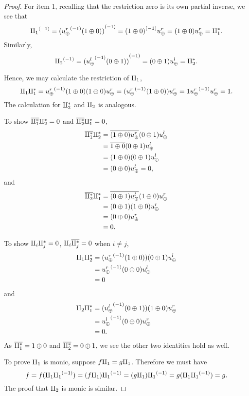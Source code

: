 \begin{proof}
  For item 1, recalling that the restriction zero is its own partial inverse,
  we see that
  \[
    {\amalg_{1}}^{(-1)} = {({u_{\oplus}^r}^{(-1)}(1\oplus0))}^{(-1)}  = {(1\oplus0)}^{(-1)}u_{\oplus}^r = (1\oplus0)u_{\oplus}^r = \amalg_{1}^{*}.
  \]
  Similarly,
  \[
    {\amalg_{2}}^{(-1)} = {({u_{\oplus}^l}^{(-1)}(0\oplus1))}^{(-1)} = (0\oplus1)u_{\oplus}^l = \amalg_{2}^{*}.
  \]

  Hence, we may calculate the restriction of $\amalg_{1}$,
  \begin{equation*}
    \amalg_{1} \amalg_{1}^{*}   = {u_{\oplus}^r}^{(-1)}(1\oplus0) (1\oplus0)u_{\oplus}^r
      = ({u_{\oplus}^r}^{(-1)}(1\oplus0))u_{\oplus}^r = 1 {u_{\oplus}^r}^{(-1)}u_{\oplus}^r= 1.
  \end{equation*}
  The calculation for $\amalg_{2}^{*}$ and $\amalg_{2}$ is analogous.

  To show $\overline{\amalg_{1}^{*}} \amalg_{2}^{*} = 0$ and $\overline{\amalg_{2}^{*}} \amalg_{1}^{*} = 0$,
  \begin{align*}
    \overline{\amalg_{1}^{*}} \amalg_{2}^{*}  &= \overline{(1\oplus0)u_{\oplus}^r}(0\oplus1)u_{\oplus}^l\\
      &= \overline{1\oplus0} (0 \oplus 1)u_{\oplus}^l\\
      &= (1\oplus0) (0\oplus1)u_{\oplus}^l\\
      &= (0\oplus0)u_{\oplus}^l  = 0,
  \end{align*}
  and
  \begin{align*}
    \overline{\amalg_{2}^{*}} \amalg_{1}^{*}  &= \overline{(0\oplus1)u_{\oplus}^l}(1\oplus0)u_{\oplus}^r \\
     &= (0\oplus1) (1\oplus0)u_{\oplus}^r\\
     &= (0\oplus0)u_{\oplus}^r\\
     &= 0.
 \end{align*}

  To show $\amalg_{i} \amalg_{j}^{*} = 0$, $\amalg_{i} \overline{\amalg_{j}^{*}} = 0$ when $i\ne j$,
  \begin{align*}
    \amalg_{1} \amalg_{2}^{*} &= ({u_{\oplus}^r}^{(-1)}(1\oplus0))(0\oplus1) u_{\oplus}^l\\
       &= {u_{\oplus}^r}^{(-1)}(0\oplus0)u_{\oplus}^l\\
       &= 0
  \end{align*}
  and
  \begin{align*}
    \amalg_{2} \amalg_{1}^{*} &= ({u_{\oplus}^l}^{(-1)}(0\oplus1))(1\oplus0) u_{\oplus}^r\\
      &= {u_{\oplus}^l}^{(-1)}(0\oplus0)u_{\oplus}^r\\
       &= 0.
  \end{align*}
  As $\overline{\amalg_{1}^{*}} = 1\oplus0$ and $\overline{\amalg_{2}^{*}} = 0 \oplus1$, we see the other two identities hold as well.

  To prove $\amalg_{1}$ is monic, suppose $f\amalg_{1} = g\amalg_{1}$. Therefore we must have
  \[
    f = f (\amalg_{1} {\amalg_{1}}^{(-1)}) = (f \amalg_{1}) {\amalg_{1}}^{(-1)} = (g \amalg_{1}) {\amalg_{1}}^{(-1)} = g (\amalg_{1} {\amalg_{1}}^{(-1)}) = g.
  \]
  The proof that $\amalg_{2}$ is monic is similar.
\end{proof}

